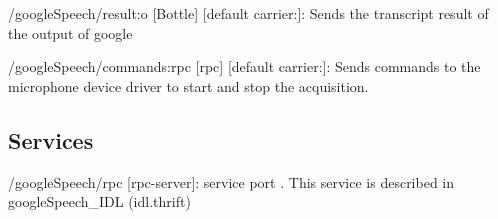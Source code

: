 \begin{DoxyItemize}
\item /google\+Speech/result\+:o \mbox{[}Bottle\mbox{]} \mbox{[}default carrier\+:\mbox{]}\+: Sends the transcript result of the output of google
\item /google\+Speech/commands\+:rpc \mbox{[}rpc\mbox{]} \mbox{[}default carrier\+:\mbox{]}\+: Sends commands to the microphone device driver to start and stop the acquisition.
\end{DoxyItemize}\hypertarget{group__skeletonViewer_services_sec}{}\subsection{Services}\label{group__skeletonViewer_services_sec}

\begin{DoxyItemize}
\item /google\+Speech/rpc \mbox{[}rpc-\/server\mbox{]}\+: service port . This service is described in google\+Speech\+\_\+\+I\+DL (idl.\+thrift) 
\end{DoxyItemize}